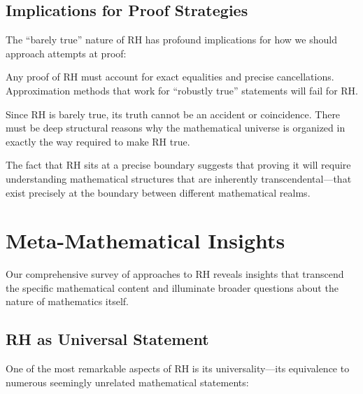 \subsection{Implications for Proof Strategies}
\label{subsec:proof_strategy_implications}

The ``barely true'' nature of RH has profound implications for how we should approach attempts at proof:

\begin{principle}
Any proof of RH must account for exact equalities and precise cancellations. Approximation methods that work for ``robustly true'' statements will fail for RH.
\end{principle}

\begin{principle}
Since RH is barely true, its truth cannot be an accident or coincidence. There must be deep structural reasons why the mathematical universe is organized in exactly the way required to make RH true.
\end{principle}

\begin{principle}
The fact that RH sits at a precise boundary suggests that proving it will require understanding mathematical structures that are inherently transcendental—that exist precisely at the boundary between different mathematical realms.
\end{principle}

\section{Meta-Mathematical Insights}
\label{sec:meta_insights}

Our comprehensive survey of approaches to RH reveals insights that transcend the specific mathematical content and illuminate broader questions about the nature of mathematics itself.

\subsection{RH as Universal Statement}
\label{subsec:universal_statement}

One of the most remarkable aspects of RH is its universality—its equivalence to numerous seemingly unrelated mathematical statements:

